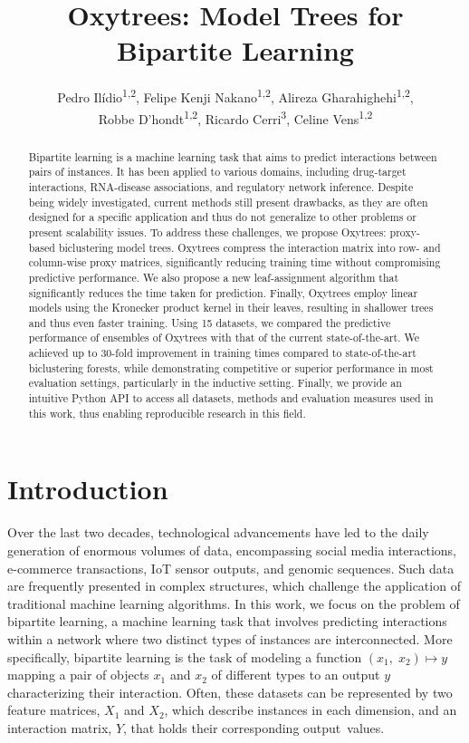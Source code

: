 \documentclass[letterpaper]{article}
\title{Oxytrees: Model Trees for Bipartite Learning}
\author{
    Pedro Ilídio\textsuperscript{\rm 1,\rm 2},
    Felipe Kenji Nakano\textsuperscript{\rm 1,\rm 2},
    Alireza Gharahighehi\textsuperscript{\rm 1,\rm 2},\\
    Robbe D'hondt\textsuperscript{\rm 1,\rm 2},
    Ricardo Cerri\textsuperscript{\rm 3},
    Celine Vens\textsuperscript{\rm 1,\rm 2}
}
\begin{document}
\maketitle

\begin{abstract}
Bipartite learning is a machine learning task that aims to predict interactions between pairs of instances. It has been applied to various domains, including drug-target interactions, RNA-disease associations, and regulatory network inference. Despite being widely investigated, current methods still present drawbacks, as they are often designed for a specific application and thus do not generalize to other problems or present scalability issues.
To address these challenges, we propose Oxytrees: proxy-based biclustering model trees. Oxytrees compress the interaction matrix into row- and column-wise proxy matrices, significantly reducing training time without compromising predictive performance.
We also propose a new leaf-assignment algorithm that significantly reduces the time taken for prediction.
Finally, Oxytrees employ linear models using the Kronecker product kernel in their leaves, resulting in shallower trees and thus even faster training. Using 15 datasets, we compared the predictive performance of ensembles of Oxytrees with that of the current state-of-the-art.
We achieved up to 30-fold improvement in training times compared to state-of-the-art biclustering forests, while demonstrating competitive or superior performance in most evaluation settings, particularly in the inductive setting.
Finally, we provide an intuitive Python API to access all datasets, methods and evaluation measures used in this work, thus enabling reproducible research in this field.
\end{abstract}

\begin{links}
\end{links}


\section{Introduction}
\label{sec:introduction}


Over the last two decades, technological advancements have led to the daily generation of enormous volumes of data, encompassing social media interactions, e-commerce transactions, IoT sensor outputs, and genomic sequences.
Such data are frequently presented in complex structures, which challenge the application of traditional machine learning algorithms.
In this work, we focus on the problem of bipartite learning, a machine learning task that involves predicting interactions within a network where two distinct types of instances are interconnected.
More specifically, bipartite learning is the task of modeling a function $(x_1,\; x_2) \mapsto y$ mapping a pair of objects $x_1$ and $x_2$ of different types to an output $y$ characterizing their interaction. Often, these datasets can be represented by two feature matrices, $X_1$ and $X_2$, which describe instances in each dimension, and an interaction matrix, $Y$, that holds their corresponding output~values.
\end{document}
